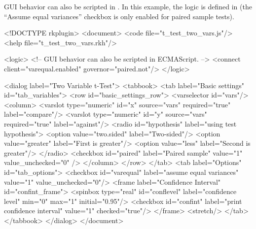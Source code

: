 GUI behavior can also be scripted in . In this example, the logic is defined in  (the ``Assume equal variances'' checkbox
is only enabled for paired sample tests).
\begin{Code}
<!DOCTYPE rkplugin>
<document>
  <code file="t_test_two_vars.js"/>
  <help file="t_test_two_vars.rkh"/>

  <logic>
    <!-- GUI behavior can also be scripted in ECMAScript. -->
    <connect client="varequal.enabled" governor="paired.not"/>
  </logic>

  <dialog label="Two Variable t-Test">
    <tabbook>
      <tab label="Basic settings" id="tab_variables">
        <row id="basic_settings_row">
          <varselector id="vars"/>
          <column>
            <varslot type="numeric" id="x" source="vars" required="true"
              label="compare"/>                                                             
            <varslot type="numeric" id="y" source="vars" required="true"
              label="against"/>
            <radio id="hypothesis" label="using test hypothesis">
              <option value="two.sided" label="Two-sided"/>
              <option value="greater" label="First is greater"/>
              <option value="less" label="Second is greater"/>
            </radio>
            <checkbox id="paired" label="Paired sample" value="1" value_unchecked="0" />
          </column>
        </row>
      </tab>
      <tab label="Options" id="tab_options">
        <checkbox id="varequal" label="assume equal variances" value="1"
          value_unchecked="0"/>
        <frame label="Confidence Interval" id="confint_frame">
          <spinbox type="real" id="conflevel" label="confidence level" min="0" max="1"
            initial="0.95"/>
          <checkbox id="confint" label="print confidence interval" value="1"
            checked="true"/>
        </frame>
        <stretch/>
      </tab>
    </tabbook>
  </dialog>
</document>
\end{Code}

